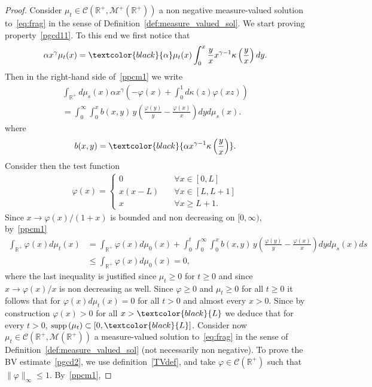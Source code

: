 \documentclass[10pt]{amsart}
\theoremstyle{definition}\newtheorem{defi}[theo]{Definition}\newtheorem{rema}[theo]{Remark}\newtheorem{exam}[theo]{Example}\newtheorem{exem}[theo]{Example}\newtheorem{nota}[theo]{Notation}
\newcommand*\dst{\displaystyle}
\newcommand*\R{\mathbb{R}}
\newcommand*\M{\mathcal{M}}
\newcommand{\clC}{\mathcal{C}}
\newcommand{\MT}[1]{\textcolor{black}{#1}}
\newcommand*\supp{{\mbox{\small\rm supp}}\,}
\let\oldforall\forall
\renewcommand*{\forall}{\mathrel{\oldforall}}
\begin{document}
\begin{proof}
Consider $\mu_t \in \clC(\R^+,\M^+(\R^+))$ a non negative measure-valued solution to~\eqref{eq:frag} in the sense of Definition~\eqref{def:measure_valued_sol}. We start proving property~\eqref{pgcd11}. To this end we first notice that
\begin{align*}
\alpha x^\gamma \mu _t(x)=\MT{\alpha}\mu _t(x)\int _0^x\frac {y} {x}x^{\gamma -1}\kappa \left(\frac {y} {x}\right)dy.
\end{align*}
Then in the right-hand side of~\eqref{ppcm1} we write
\begin{multline*}
\int_{\R^+} d\mu_s(x) \alpha x^{\gamma}\left(- \varphi(x) + \dst\int_{0}^{1} d\kappa(z)\varphi(xz)\right)\\
=\int _0^\infty\int _0^x b(x, y)\, y\left(\frac {\varphi (y)} {y}- \frac {\varphi (x)} {x}\right)dyd\mu _s(x).
\end{multline*}
where
\begin{align}\label{bxy}
b(x,y)=\MT{\alpha x^{\gamma-1}\kappa \left(
\frac{y}{x}\right)}.
\end{align}
Consider then the test function
\begin{align*}
\varphi (x)=
\begin{cases}
0 &\forall x\in [0, L]\\
x(x-L)\quad &\forall x\in [L, L+1]\\
x &\forall x\ge L+1.
\end{cases}
\end{align*}
Since $x\to \varphi (x)/(1+x)$ is bounded and non decreasing on $[0, \infty)$, by~\eqref{ppcm1}
\begin{align*}
\int_{\R^+} \varphi(x) d\mu_t(x)&= \int_{\R^+}
\varphi(x) d\mu_0(x) + \int_0^t \int _0^\infty\int _0^x b(x, y)\, y\left(\frac {\varphi (y)} {y}- \frac {\varphi (x)} {x}\right)dyd\mu _s(x) ds\\
& \le \int_{\R^+} \varphi(x) d\mu_0(x) =0,
\end{align*}
where the last inequality is justified since $\mu_t\geq 0$ for $t\geq 0$ and since $x\to \varphi(x)/x$ is non decreasing as well. Since $\varphi\ge 0$ and $ \mu _t\ge 0$ for all $t\ge 0$ it follows that for $\varphi (x)d\mu _t(x)=0$ for all $t>0$ and almost every $x>0$. Since by construction $\varphi (x)>0$ for all $x>\MT{L}$ we deduce that for every $t>0$, $\supp (\mu _t)\subset [0, \MT{L}]$.
Consider now $\mu_t \in \clC(\R^+,\M(\R^+))$ a measure-valued solution to~\eqref{eq:frag} in the sense of Definition~\eqref{def:measure_valued_sol} (not necessarily non negative). To prove the BV estimate~\eqref{pgcd2}, we use definition~\eqref{TVdef}, and take $\varphi \in \clC(\R^+)$ such that $\|\varphi\|_{\infty} \leq 1$. By~\eqref{ppcm1},

\end{proof}
\end{document}

